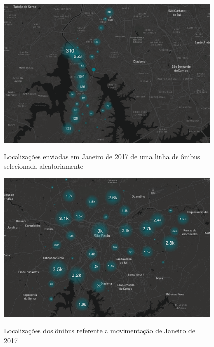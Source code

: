 \documentclass[
	12pt,				%
	oneside,			%
	a4paper,			%
	english,			%
	brazil				%
	]{abntex2ppgsi}
\begin{document}
{{\begin{figure}[!htb]%
	\centering
 	  \caption{Localizações enviadas em Janeiro de 2017 de uma linha de ônibus selecionada aleatoriamente}
		\includegraphics[width=0.95\linewidth]{images/only_one_bus_map.png}
	\label{fig:only_one_bus_map}
\end{figure}

\begin{figure}[!htb]%
	\centering
 	  \caption{Localizações dos ônibus referente a movimentação de Janeiro de 2017}
		\includegraphics[width=0.95\linewidth]{images/buses_map.png}
	\label{fig:buses_map}
\end{figure}

}}
\end{document}
